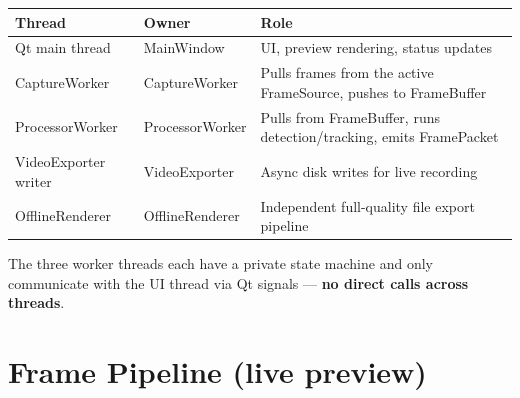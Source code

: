 \documentclass[11pt,a4paper,openany]{report}
\begin{document}
\begin{tabularx}{\linewidth}{@{}llX@{}}
    \toprule
    \textbf{Thread} & \textbf{Owner} & \textbf{Role} \\
    \midrule
    Qt main thread       & MainWindow      & UI, preview rendering, status updates \\
    CaptureWorker        & CaptureWorker   & Pulls frames from the active FrameSource, pushes to FrameBuffer \\
    ProcessorWorker      & ProcessorWorker & Pulls from FrameBuffer, runs detection/tracking, emits FramePacket \\
    VideoExporter writer & VideoExporter   & Async disk writes for live recording \\
    OfflineRenderer      & OfflineRenderer & Independent full-quality file export pipeline \\
    \bottomrule
\end{tabularx}

The three worker threads each have a private state machine and only
communicate with the UI thread via Qt signals --- \textbf{no direct calls
across threads}.

\section{Frame Pipeline (live preview)}
\end{document}
